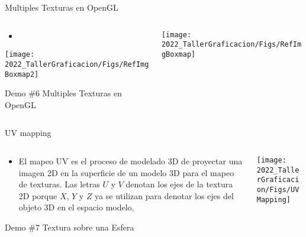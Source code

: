 \begin{frame}{Multiples Texturas en OpenGL}
\begin{columns}
\begin{column}{0.5\textwidth}
\begin{itemize}
\item 
\end{itemize}
    \begin{center}
        \texttt{[image: 2022\_TallerGraficacion/Figs/RefImgBoxmap2]}
     \end{center}
\begin{block}{Demo \#6}
Multiples Texturas en OpenGL
\end{block}
\end{column}
\begin{column}{0.5\textwidth}
    \begin{center}
\texttt{[image: 2022\_TallerGraficacion/Figs/RefImgBoxmap]}
     \end{center}
\end{column}
\end{columns}

\end{frame}

\begin{frame}{UV mapping}
\begin{columns}
\begin{column}{0.5\textwidth}
\begin{itemize}
\item El mapeo UV es el proceso de modelado 3D de proyectar una imagen 2D en la superficie de un modelo 3D para el mapeo de texturas. Las letras $U$ y $V$ denotan los ejes de la textura 2D porque $X$, $Y$ y $Z$ ya se utilizan para denotar los ejes del objeto 3D en el espacio modelo,
\end{itemize}
\begin{block}{Demo \#7}
Textura sobre una Esfera
\end{block}
\end{column}
\begin{column}{0.5\textwidth}
    \begin{center}
         \texttt{[image: 2022\_TallerGraficacion/Figs/UVMapping]}
     \end{center}
\end{column}
\end{columns}
\end{frame}



